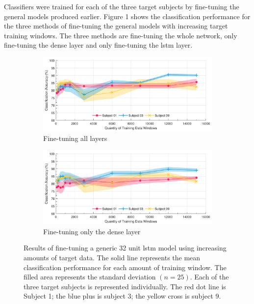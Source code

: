 Classifiers were trained for each of the three target subjects by fine-tuning the general models produced earlier. Figure 1 shows the classification performance for the three methods of fine-tuning the general models with increasing target training windows. The three methods are fine-tuning the whole network, only fine-tuning the dense layer and only fine-tuning the \acrshort{lstm} layer.

\begin{figure}[p]
    \centering
    \begin{subfigure}{\textwidth}
        \centering
        \includegraphics[width=\textwidth]{content/5-Personalisation/ch5_pre_trained_model_accuracy.pdf}
        \caption{Fine-tuning all layers}
        \label{subfig:ch5_fine-tuning-all-layers}
    \end{subfigure}
    \begin{subfigure}{\textwidth}
        \centering
        \includegraphics[width=\textwidth]{content/5-Personalisation/ch5_frozen_lstm_layer_accuracy.pdf}
        \caption{Fine-tuning only the dense layer}
    \end{subfigure}
    \caption[Results of fine-tuning a generic 32 unit  model using increasing amounts of target data]{Results of fine-tuning a generic 32 unit \acrshort{lstm} model using increasing amounts of target data. The solid line represents the mean classification performance for each amount of training window. The filled area represents the standard deviation $(n=25)$. Each of the three target subjects is represented individually. The red dot line is Subject 1; the blue plus is subject 3; the yellow cross is subject 9.}
    \label{fig:ch5_pretrained_model}
\end{figure}
